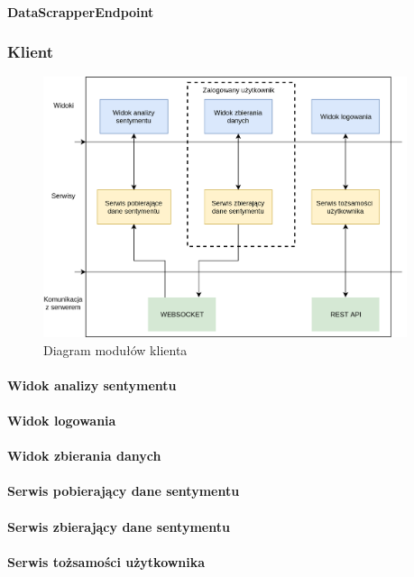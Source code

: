 \paragraph*{DataScrapperEndpoint}
\newpage
\subsubsection{Klient}
\begin{figure}[h!]
  \centering
    \includegraphics[width=0.95\textwidth]{img/client-modules.png}
  \caption{Diagram modułów klienta}
  \label{fig:client}
\end{figure}

\paragraph*{Widok analizy sentymentu}
\paragraph*{Widok logowania}
\paragraph*{Widok zbierania danych}
\paragraph*{Serwis pobierający dane sentymentu}
\paragraph*{Serwis zbierający dane sentymentu}
\paragraph*{Serwis tożsamości użytkownika}

